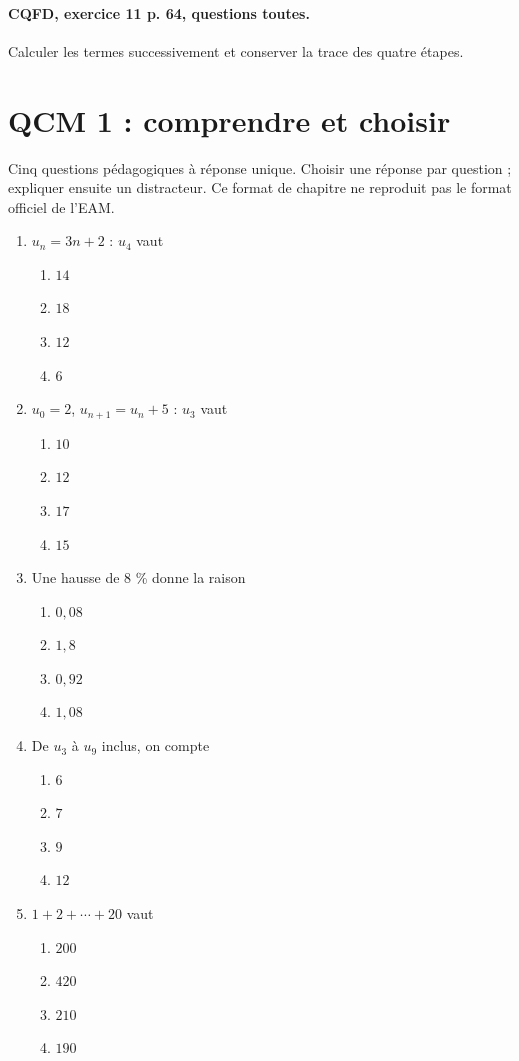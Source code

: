 \paragraph{CQFD, exercice 11 p. 64, questions toutes.}\label{C01-M2} Calculer les termes successivement et conserver la trace des quatre étapes.
\begingroup\small
\clearpage\section*{QCM 1 : comprendre et choisir}\label{C01-Q1}
Cinq questions pédagogiques à réponse unique. Choisir une réponse par question ; expliquer ensuite un distracteur. Ce format de chapitre ne reproduit pas le format officiel de l’EAM.
\begin{enumerate}
\item $u_n=3n+2$ : $u_4$ vaut
\begin{enumerate}[label=\Alph*.,itemsep=2pt]
\item $14$
\item $18$
\item $12$
\item $6$
\end{enumerate}
\item $u_0=2$, $u_{n+1}=u_n+5$ : $u_3$ vaut
\begin{enumerate}[label=\Alph*.,itemsep=2pt]
\item $10$
\item $12$
\item $17$
\item $15$
\end{enumerate}
\item Une hausse de 8 \% donne la raison
\begin{enumerate}[label=\Alph*.,itemsep=2pt]
\item $0{,}08$
\item $1{,}8$
\item $0{,}92$
\item $1{,}08$
\end{enumerate}
\item De $u_3$ à $u_9$ inclus, on compte
\begin{enumerate}[label=\Alph*.,itemsep=2pt]
\item $6$
\item $7$
\item $9$
\item $12$
\end{enumerate}
\item $1+2+\cdots+20$ vaut
\begin{enumerate}[label=\Alph*.,itemsep=2pt]
\item $200$
\item $420$
\item $210$
\item $190$
\end{enumerate}
\end{enumerate}
